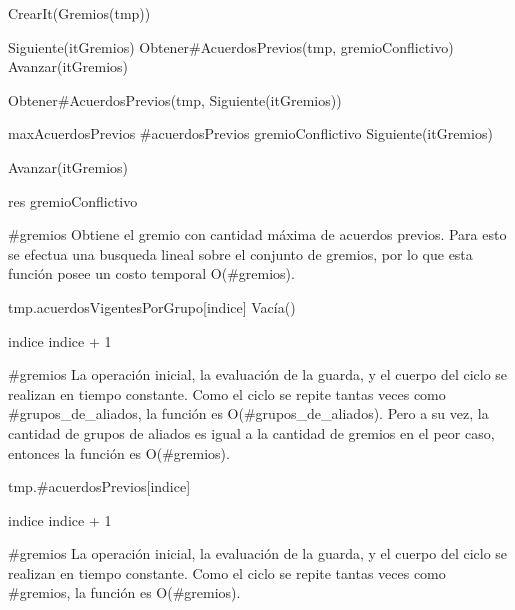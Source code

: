 {
	\state {} \asig CrearIt(Gremios(tmp))							
	\state

	\state {} \asig Siguiente(itGremios)							
	\state {} \asig Obtener\#AcuerdosPrevios(tmp, gremioConflictivo)				
	\state Avanzar(itGremios)																	
	\state

																	
		\state

		\state {} \asig Obtener\#AcuerdosPrevios(tmp, Siguiente(itGremios))		

									

			\state maxAcuerdosPrevios \asig \#acuerdosPrevios						
			\state gremioConflictivo \asig Siguiente(itGremios)			
		\endif

		\state
		\state Avanzar(itGremios)										
	\endwhile
	\state

	\state res \asig gremioConflictivo									
}
{\#gremios}
{Obtiene el gremio con cantidad m\'axima de acuerdos previos. Para esto se efectua una busqueda lineal sobre el conjunto de gremios, por lo que esta funci\'on posee un costo temporal O(\#gremios).}

{
	\state {} 									
				
		\state

		\state tmp.acuerdosVigentesPorGrupo[indice] \asig Vac\'ia()		

		\state
		\state indice \asig indice + 1									
	\endwhile

}
{\#gremios}
{ La operaci\'on inicial, la evaluaci\'on de la guarda, y el cuerpo del ciclo se realizan en tiempo constante. Como el ciclo se repite tantas veces como \#grupos\_de\_aliados, la funci\'on es O(\#grupos\_de\_aliados). Pero a su vez, la cantidad de grupos de aliados es igual a la cantidad de gremios en el peor caso, entonces la funci\'on es O(\#gremios). }

{
	\state {} 					
			
		\state

		\state tmp.\#acuerdosPrevios[indice] 			

		\state
		\state indice \asig indice + 1					
	\endwhile
}
{\#gremios}
{ La operaci\'on inicial, la evaluaci\'on de la guarda, y el cuerpo del ciclo se realizan en tiempo constante. Como el ciclo se repite tantas veces como \#gremios, la funci\'on es O(\#gremios). }

